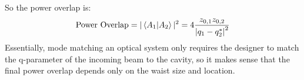 \begin{appendices}
	So the power overlap is:
	\begin{equation}\label{gauss_power_ovl}
	\text{Power Overlap} = \vert \braket{A_1|A_2} \vert^2 = 4 \frac{ z_{0,1}z_{0,2}}{\abs{q_1 - q_2^*}^2}
	\end{equation}
	Essentially, mode matching an optical system only requires the designer to match the q-parameter of the incoming beam to the cavity, so it makes sense that the final power overlap depends only on the waist size and location.


\end{appendices} 
